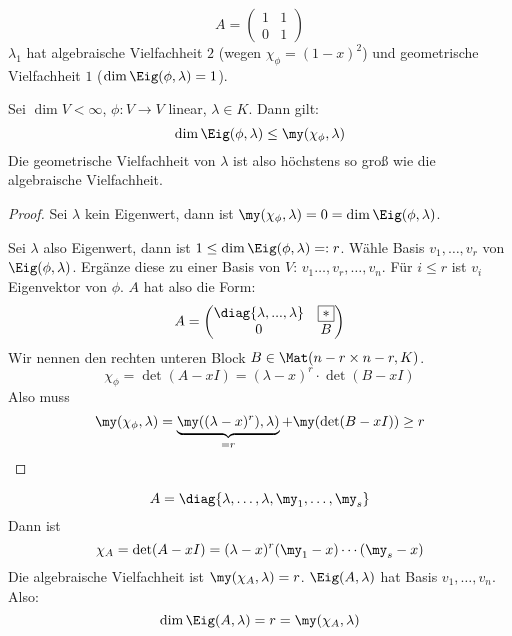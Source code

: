 \documentclass{mycourse}
\begin{document}
\begin{ex}
\[
A=\begin{pmatrix}1&1\\0&1\end{pmatrix}
\]
$\lambda_1$ hat algebraische Vielfachheit $2$ (wegen $\chi_\phi=(1-x)^2$) und geometrische Vielfachheit $1$ ($\dim \Eig(\phi,\lambda)=1$).
\end{ex}

\begin{lem}
\label{11.2}
Sei $\dim V<\infty$, $\phi: V\to V$ linear, $\lambda\in K$.
Dann gilt:
\[
\dim \Eig(\phi,\lambda) \le \my(\chi_\phi,\lambda)
\]
Die geometrische Vielfachheit von $\lambda$ ist also höchstens so groß wie die algebraische Vielfachheit.
\begin{proof}
Sei $\lambda$ kein Eigenwert, dann ist $\my(\chi_\phi, \lambda)=0=\dim \Eig(\phi,\lambda)$.

Sei $\lambda$ also Eigenwert, dann ist $1\le \dim \Eig(\phi,\lambda) =: r$.
Wähle Basis $v_1,\dotsc, v_r$ von $\Eig(\phi,\lambda)$.
Ergänze diese zu einer Basis von $V$: $v_1\dotsc, v_r,\dotsc, v_n$.
Für $i\le r$ ist $v_i$ Eigenvektor von $\phi$.
$A$ hat also die Form:
\[
A=\begin{pmatrix}
\diag\{\lambda, ..., \lambda\} & \fbox{$*$} \\
0 & B
\end{pmatrix}
\]
Wir nennen den rechten unteren Block $B\in \Mat(n-r\times n-r, K)$.
\[
\chi_\phi = \det(A-xI) = (\lambda-x)^r\cdot \det(B-xI)
\]
Also muss
\[
\my(\chi_\phi,\lambda) = \underbrace{\my((\lambda-x)^r),\lambda)}_{=r} + \my(\det(B-xI)) \ge r
\]
\end{proof}
\end{lem}


\begin{ex}
\[
	A=\diag\{\lambda,\dotsc,\lambda,\my_1,\dotsc, \my_s\}
\]
Dann ist
\[
\chi_A = \det(A-xI) = (\lambda -x)^r(\my_1-x)\dotsb(\my_s-x)
\]
Die algebraische Vielfachheit ist $\my(\chi_A, \lambda)=r$.
$\Eig(A, \lambda)$ hat Basis $v_1, \dotsc, v_n$.
Also:
\[
\dim \Eig(A,\lambda) = r = \my(\chi_A,\lambda)
\]
\end{ex}
\end{document}
